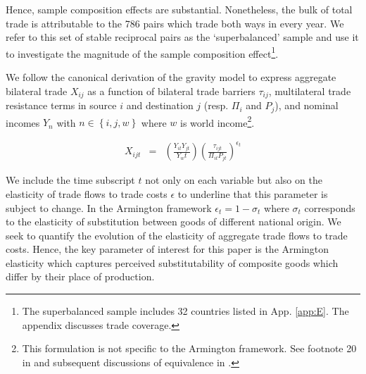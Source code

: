 \documentclass[12pt,twoside,a4paper,notitlepage]{article}
\begin{document}
Hence, sample composition effects are substantial.
Nonetheless, the bulk of total trade is attributable to the 786 pairs which trade both ways in every year.
We refer to this set of stable reciprocal pairs as the `superbalanced' sample and use it to investigate the magnitude of the sample composition effect\footnote{The superbalanced sample includes 32 countries listed in App.
\ref{app:E}.
The appendix discusses trade coverage.}.

We follow the canonical \cite{Anderson2003a} derivation of the gravity model to express aggregate bilateral trade $X_{ij}$ as a function of bilateral trade barriers $\tau_{ij}$, multilateral trade resistance terms in source $i$ and destination $j$ (resp.
$\Pi_{i}$ and $P_{j}$), and nominal incomes $Y_{n}$ with $n\in\left\{i,j,w\right\}$ where $w$ is world income\footnote{This formulation is not specific to the Armington framework.
See footnote 20 in \cite{Eaton2002} and subsequent discussions of equivalence in  \cite{Arkolakis2012, Head2013}.}.

 
\begin{eqnarray}
X_{ijt} & = & \left(\frac{Y_{it}Y_{jt}}{Y_wt}\right)\left(\frac{\tau_{ijt}}{\Pi_{it}P_{jt}}\right)^{\epsilon_t}\label{eqn:1}
\end{eqnarray}

We include the time subscript $t$ not only on each variable but also on the elasticity of trade flows to trade costs $\epsilon$ to underline that this parameter is subject to change.
In the Armington framework $\epsilon_t=1-\sigma_t$ where $\sigma_t$ corresponds to the elasticity of substitution between goods of different national origin.
We seek to quantify the evolution of the elasticity of aggregate trade flows to trade costs.
Hence, the key parameter of interest for this paper is the Armington elasticity which captures perceived substitutability of composite goods which differ by their place of production.
\end{document}
